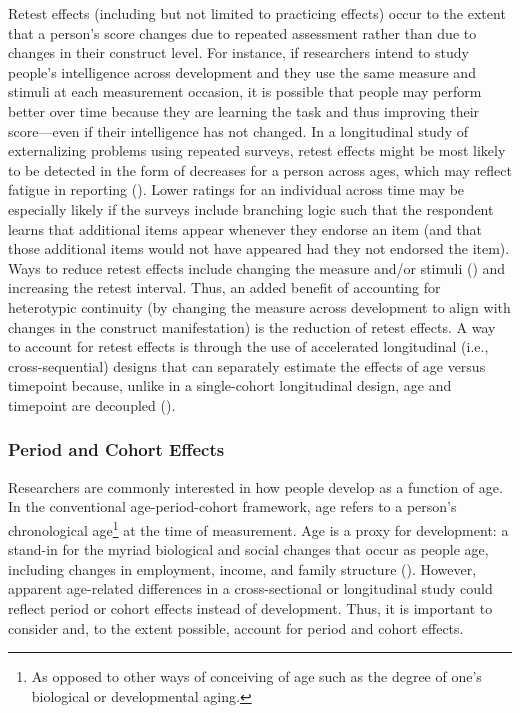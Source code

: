 \documentclass[
  american,
  letterpaper,
  12pt]{article}
\begin{document}
Retest effects (including but not limited to practicing effects) occur
to the extent that a person's score changes due to repeated assessment
rather than due to changes in their construct level. For instance, if
researchers intend to study people's intelligence across development and
they use the same measure and stimuli at each measurement occasion, it
is possible that people may perform better over time because they are
learning the task and thus improving their score---even if their
intelligence has not changed. In a longitudinal study of externalizing
problems using repeated surveys, retest effects might be most likely to
be detected in the form of decreases for a person across ages, which may
reflect fatigue in reporting (). Lower ratings for an individual across time may be especially
likely if the surveys include branching logic such that the respondent
learns that additional items appear whenever they endorse an item (and
that those additional items would not have appeared had they not
endorsed the item). Ways to reduce retest effects include changing the
measure and/or stimuli ()
and increasing the retest interval. Thus, an added benefit of accounting
for heterotypic continuity (by changing the measure across development
to align with changes in the construct manifestation) is the reduction
of retest effects. A way to account for retest effects is through the
use of accelerated longitudinal (i.e., cross-sequential) designs that
can separately estimate the effects of age versus timepoint because,
unlike in a single-cohort longitudinal design, age and timepoint are
decoupled ().

\subsubsection{Period and Cohort
Effects}\label{period-and-cohort-effects}

Researchers are commonly interested in how people develop as a function
of age. In the conventional age-period-cohort framework, age refers to a
person's chronological age\footnote{As opposed to other ways of
  conceiving of age such as the degree of one's biological or
  developmental aging.} at the time of measurement. Age is a proxy for
development: a stand-in for the myriad biological and social changes
that occur as people age, including changes in employment, income, and
family structure (). However,
apparent age-related differences in a cross-sectional or longitudinal
study could reflect period or cohort effects instead of development.
Thus, it is important to consider and, to the extent possible, account
for period and cohort effects.
\end{document}
